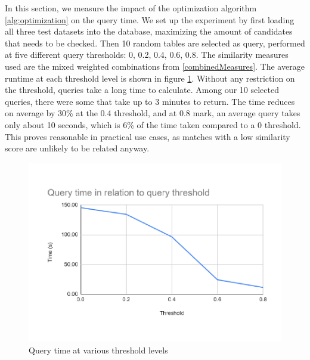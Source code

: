 In this section, we measure the impact of the optimization algorithm \ref{alg:optimization} on the query time. We set up the experiment by first loading all three test datasets into the database, maximizing the amount of candidates that needs to be checked. Then 10 random tables are selected as query, performed at five different query thresholds: 0, 0.2, 0.4, 0.6, 0.8. The similarity measures used are the mixed weighted combinations from \ref{combinedMeasures}. The average runtime at each threshold level is shown in figure \ref{fig:queryThresholdTime}. Without any restriction on the threshold, queries take a long time to calculate. Among our 10 selected queries, there were some that take up to 3 minutes to return. The time reduces on average by 30\% at the 0.4 threshold, and at 0.8 mark, an average query takes only about 10 seconds, which is 6\% of the time taken compared to a 0 threshold. This proves reasonable in practical use cases, as matches with a low similarity score are unlikely to be related anyway.

\begin{figure}[ht]
    \centering
    \includegraphics[scale=0.6]{figures/queryThresholdTime.pdf}
    \caption{Query time at various threshold levels}
    \label{fig:queryThresholdTime}
\end{figure}